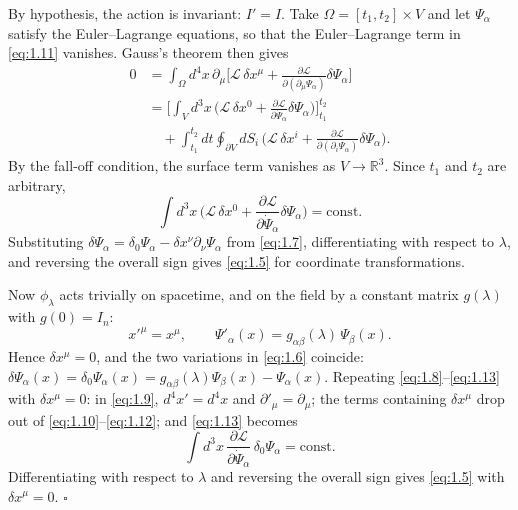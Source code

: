 \documentclass[11pt,a4paper]{article}
\newcommand{\topic}[1]{\par\addvspace{\medskipamount}\noindent{\bfseries\boldmath #1}\par\nopagebreak}
\begin{document}
By hypothesis, the action is invariant: $I'=I$. Take $\Omega=[t_1,t_2]\times V$ and let $\Psi_\alpha$ satisfy the Euler–Lagrange equations, so that the Euler–Lagrange term in \eqref{eq:1.11} vanishes. Gauss's theorem then gives
\begin{equation*}
\begin{aligned}
0
&=\int_\Omega d^4x\,\partial_\mu\biggl[
\mathcal L\,\delta x^\mu
+\frac{\partial\mathcal L}{\partial(\partial_\mu\Psi_\alpha)}\delta\Psi_\alpha
\biggr]\\
&=\biggl[\int_V d^3x\,\biggl(
\mathcal L\,\delta x^0
+\frac{\partial\mathcal L}{\partial\dot\Psi_\alpha}\delta\Psi_\alpha
\biggr)\biggr]_{t_1}^{t_2}\\
&\quad
+\int_{t_1}^{t_2}dt\oint_{\partial V}dS_i\,\biggl(
\mathcal L\,\delta x^i
+\frac{\partial\mathcal L}{\partial(\partial_i\Psi_\alpha)}\delta\Psi_\alpha
\biggr).
\end{aligned}
\tag{1.12}\label{eq:1.12}
\end{equation*}
By the fall-off condition, the surface term vanishes as $V\to\mathbb R^3$. Since $t_1$ and $t_2$ are arbitrary,
\begin{equation*}
\int d^3x\,\biggl(
\mathcal L\,\delta x^0
+\frac{\partial\mathcal L}{\partial\dot\Psi_\alpha}\delta\Psi_\alpha
\biggr)=\text{const}.
\tag{1.13}\label{eq:1.13}
\end{equation*}
Substituting $\delta\Psi_\alpha=\delta_0\Psi_\alpha-\delta x^\nu\partial_\nu\Psi_\alpha$ from \eqref{eq:1.7}, differentiating with respect to $\lambda$, and reversing the overall sign gives \eqref{eq:1.5} for coordinate transformations.

\topic{(B) Internal Transformation}

Now $\phi_\lambda$ acts trivially on spacetime, and on the field by a constant matrix $g(\lambda)$ with $g(0)=I_n$:
\begin{equation*}
x'^\mu=x^\mu,\qquad
\Psi'_\alpha(x)=g_{\alpha\beta}(\lambda)\,\Psi_\beta(x).
\tag{1.14}\label{eq:1.14}
\end{equation*}
Hence $\delta x^\mu=0$, and the two variations in \eqref{eq:1.6} coincide: $\delta\Psi_\alpha(x)=\delta_0\Psi_\alpha(x)=g_{\alpha\beta}(\lambda)\Psi_\beta(x)-\Psi_\alpha(x)$. Repeating \eqref{eq:1.8}–\eqref{eq:1.13} with $\delta x^\mu=0$: in \eqref{eq:1.9}, $d^4x'=d^4x$ and $\partial'_\mu=\partial_\mu$; the terms containing $\delta x^\mu$ drop out of \eqref{eq:1.10}–\eqref{eq:1.12}; and \eqref{eq:1.13} becomes
\begin{equation*}
\int d^3x\,\frac{\partial\mathcal L}{\partial\dot\Psi_\alpha}\,\delta_0\Psi_\alpha=\text{const}.
\tag{1.15}\label{eq:1.15}
\end{equation*}
Differentiating with respect to $\lambda$ and reversing the overall sign gives \eqref{eq:1.5} with $\delta x^\mu=0$. $\square$
\end{document}
